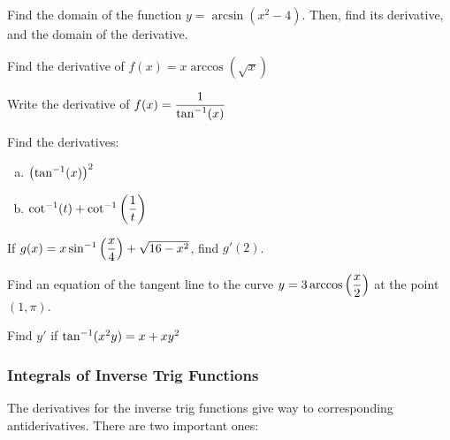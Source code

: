 \documentclass[notes]{subfiles}
\begin{document}
		\begin{ex}
			Find the domain of the function $y = \arcsin(x^2-4)$.  Then, find its derivative, and the domain of the derivative.
		\end{ex}
			\newpage
		
		\begin{ex}
			Find the derivative of $f(x) = x\arccos(\sqrt{x})$
		\end{ex}	
			
		\begin{ex}
			Write the derivative of $f(x) = \dfrac{1}{\tan^{-1}(x)}$
		\end{ex}
		
		\begin{ex}
			Find the derivatives:
			\begin{enumerate}[(a)]
				\item $\left( \tan^{-1}(x)\right)^2$
					
				\item $\cot^{-1}(t) + \cot^{-1}\left( \dfrac{1}{t}\right)$
			\end{enumerate}
		\end{ex}	
			\newpage
			
		\begin{ex}
			If $g(x) = x\sin^{-1}\left( \dfrac{x}{4}\right) +\sqrt{16-x^2}$, find $g'(2)$.
		\end{ex}
			\vs{1}
			
		\begin{ex}
			Find an equation of the tangent line to the curve $y = 3\arccos\left( \dfrac{x}{2}\right)$ at the point $(1,\pi)$.
		\end{ex}
			\vs{1}
			
		\begin{ex}
			Find $y'$ if $\tan^{-1}(x^2y) = x + xy^2$
		\end{ex}
			\vs{1}
			\newpage
			
	\subsubsection*{Integrals of Inverse Trig Functions}
			The derivatives for the inverse trig functions give way to corresponding antiderivatives.  There are two important ones:
			
\end{document}
